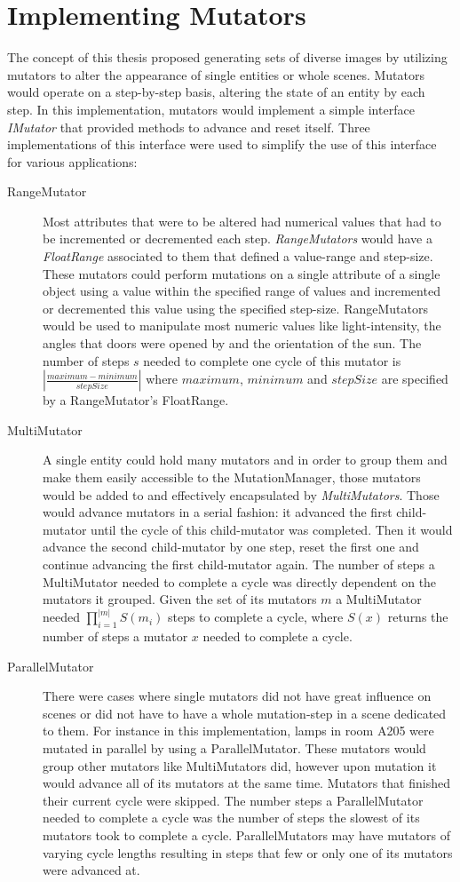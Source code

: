 \section{Implementing Mutators}
The concept of this thesis proposed generating sets of diverse images by utilizing mutators to alter the appearance of single entities or whole scenes. Mutators would operate on a step-by-step basis, altering the state of an entity by each step. In this implementation, mutators would implement a simple interface \emph{IMutator} that provided methods to advance and reset itself. Three implementations of this interface were used to simplify the use of this interface for various applications: 
\begin{description}
\item [RangeMutator] Most attributes that were to be altered had numerical values that had to be incremented or decremented each step. \emph{RangeMutators} would have a \textit{FloatRange} associated to them that defined a value-range and step-size. These mutators could perform mutations on a single attribute of a single object using a value within the specified range of values and incremented or decremented this value using the specified step-size. RangeMutators would be used to manipulate most numeric values like light-intensity, the angles that doors were opened by and the orientation of the sun. The number of steps $s$ needed to complete one cycle of this mutator is $|\frac{maximum-minimum}{stepSize}|$ where $maximum$, $minimum$ and $stepSize$ are specified by a RangeMutator's FloatRange.
\item [MultiMutator] A single entity could hold many mutators and in order to group them and make them easily accessible to the MutationManager, those mutators would be added to and effectively encapsulated by \emph{MultiMutators}. Those would advance mutators in a serial fashion: it advanced the first child-mutator until the cycle of this child-mutator was completed. Then it would advance the second child-mutator by one step, reset the first one and continue advancing the first child-mutator again. The number of steps a MultiMutator needed to complete a cycle was directly dependent on the mutators it grouped. Given the set of its mutators $m$ a MultiMutator needed $\prod_{i=1}^{|m|} S(m_i)$ steps to complete a cycle, where $S(x)$ returns the number of steps a mutator $x$ needed to complete a cycle.
\item [ParallelMutator] There were cases where single mutators did not have great influence on scenes or did not have to have a whole mutation-step in a scene dedicated to them. For instance in this implementation, lamps in room A205 were mutated in parallel by using a ParallelMutator. These mutators would group other mutators like MultiMutators did, however upon mutation it would advance all of its mutators at the same time. Mutators that finished their current cycle were skipped. The number steps a ParallelMutator needed to complete a cycle was the number of steps the slowest of its mutators took to complete a cycle. ParallelMutators may have mutators of varying cycle lengths resulting in steps that few or only one of its mutators were advanced at.
\end{description}
